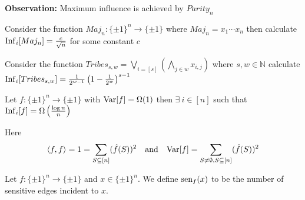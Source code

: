 \textbf{Observation:} Maximum influence is achieved by $Parity_n$

\begin{question}[ $\ifl_i{[Maj_n]}$]
	Consider the function $Maj_n:\{\pm 1\}^n\to \{\pm 1\}$ where $Maj_n=x_1\cdots x_n$ then  calculate $\operatorname{Inf}_i[Maj_n]=\frac{c}{\sqrt{n}}$ for some constant $c$
\end{question}

\begin{question}[ $\ifl_i{[Tribes_{s,w}]}$]
	Consider the function $Tribes_{s,w}=\underset{i=[s]}{\bigvee}(\bigwedge\limits_{j\in w}x_{i,j})$ where $s,w\in \mathbb{N}$  calculate $\operatorname{Inf}_i[Tribes_{s,w}]=\frac1{2^{w-1}}\left( 1-\frac1{2^w} \right)^{s-1}$
\end{question}

\begin{note}Let $f:\{\pm 1\}^n\to \{\pm 1\}$ with $\mathrm{Var}[f]=\Omega(1)$ then $\exists\ i\in[n]$ such that $\operatorname{Inf}_i[f]=\Omega\left( \frac{\log n}{n} \right)$
\end{note}
Here $$\langle f,f\rangle=1=\sum\limits_{S\subseteq [n]}(\hat{f}(S))^2\quad\text{and}\quad \mathrm{Var}[f]=\sum\limits_{S\neq \emptyset,S\subseteq [n]}(\hat{f}(S))^2$$

\begin{definition}
	Let $f:\{\pm 1\}^n\to \{\pm 1\}$ and $x\in\{\pm 1\}^n$. We define $\operatorname{sen}_f(x)$ to be the number of sensitive edges incident to $x$.
\end{definition}

